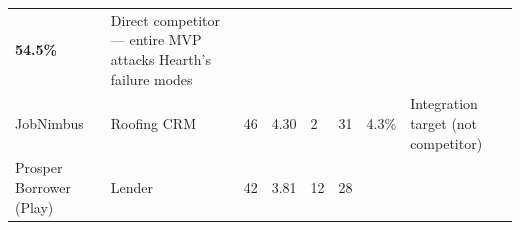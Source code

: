 \documentclass[
  10pt,
]{article}
\begin{document}
\begin{longtable}[]{@{}llllllll@{}}
\begin{minipage}[t]{0.10\columnwidth}
\textbf{54.5\%}\strut
\end{minipage} & \begin{minipage}[t]{0.10\columnwidth}\raggedright
Direct competitor --- entire MVP attacks Hearth's failure modes\strut
\end{minipage}\tabularnewline
\begin{minipage}[t]{0.10\columnwidth}\raggedright
JobNimbus\strut
\end{minipage} & \begin{minipage}[t]{0.10\columnwidth}\raggedright
Roofing CRM\strut
\end{minipage} & \begin{minipage}[t]{0.10\columnwidth}\raggedright
46\strut
\end{minipage} & \begin{minipage}[t]{0.10\columnwidth}\raggedright
4.30\strut
\end{minipage} & \begin{minipage}[t]{0.10\columnwidth}\raggedright
2\strut
\end{minipage} & \begin{minipage}[t]{0.10\columnwidth}\raggedright
31\strut
\end{minipage} & \begin{minipage}[t]{0.10\columnwidth}\raggedright
4.3\%\strut
\end{minipage} & \begin{minipage}[t]{0.10\columnwidth}\raggedright
Integration target (not competitor)\strut
\end{minipage}\tabularnewline
\begin{minipage}[t]{0.10\columnwidth}\raggedright
Prosper Borrower (Play)\strut
\end{minipage} & \begin{minipage}[t]{0.10\columnwidth}\raggedright
Lender\strut
\end{minipage} & \begin{minipage}[t]{0.10\columnwidth}\raggedright
42\strut
\end{minipage} & \begin{minipage}[t]{0.10\columnwidth}\raggedright
3.81\strut
\end{minipage} & \begin{minipage}[t]{0.10\columnwidth}\raggedright
12\strut
\end{minipage} & \begin{minipage}[t]{0.10\columnwidth}\raggedright
28\strut
\end{minipage} & \begin{minipage}[t]{0.10\columnwidth}\raggedright

\end{minipage}
\end{longtable}
\end{document}
